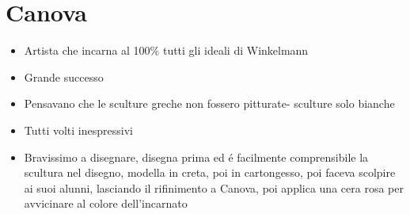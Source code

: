 \documentclass{article}
\begin{document}
\section*{Canova}
\begin{itemize}
    \item Artista che incarna al 100\% tutti gli ideali di Winkelmann
    \item Grande successo
    \item Pensavano che le sculture greche non fossero pitturate- sculture solo bianche
    \item Tutti volti inespressivi
    \item Bravissimo a disegnare, disegna prima ed é facilmente comprensibile la scultura nel disegno, modella in creta, poi in cartongesso, poi faceva scolpire ai suoi alunni, lasciando il rifinimento a Canova, poi applica una cera rosa per avvicinare al colore dell'incarnato
\end{itemize}
\end{document}
